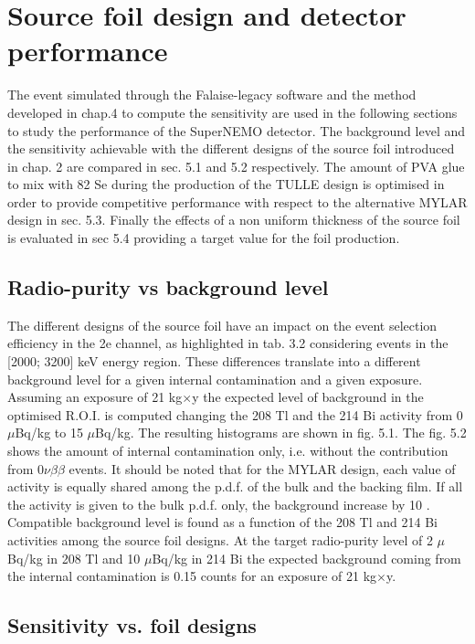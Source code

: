 \documentclass[main.tex]{subfiles}
\begin{document}
\section{Source foil design and detector performance}


\NI The event simulated through the Falaise-legacy software and the method developed in chap.4 to compute the sensitivity are used in the following sections to study the performance of the SuperNEMO detector. The background level and the sensitivity achievable with the different designs of the source foil introduced in chap. 2 are compared in sec. 5.1 and 5.2 respectively. The amount of PVA glue to mix with 82 Se during the production of the TULLE design is optimised in order to provide competitive performance with respect to the alternative MYLAR design in sec. 5.3. Finally the effects of a non uniform thickness of the source foil is evaluated in sec 5.4 providing a target value for the foil production.


\subsection{Radio-purity vs background level}


\NI The different designs of the source foil have an impact on the event selection efficiency in the 2e channel, as highlighted in tab. 3.2 considering events in the [2000; 3200] keV energy region. These differences translate into a different background level for a given internal contamination and a given exposure. Assuming an exposure of 21 kg$\times$y the expected level of background in the optimised R.O.I. is computed changing the 208 Tl and the 214 Bi activity from 0 $\mu$Bq/kg to 15 $\mu$Bq/kg. The resulting histograms are shown in fig. 5.1. The fig. 5.2 shows the amount of internal contamination only, i.e. without the contribution from 0$\nu\beta\beta$ events. It should be noted that for the MYLAR design, each value of activity is equally shared among the p.d.f. of the bulk and the backing film. If all the activity is given to the bulk p.d.f. only, the background increase by 10 . Compatible background level is found as a function of the 208 Tl and 214 Bi activities among the source foil designs. At the target radio-purity level of 2 $\mu$Bq/kg in 208 Tl and 10 $\mu$Bq/kg in 214 Bi the expected background coming from the internal contamination is 0.15 counts for an exposure of 21 kg$\times$y.


\subsection{Sensitivity vs. foil designs}
\end{document}
